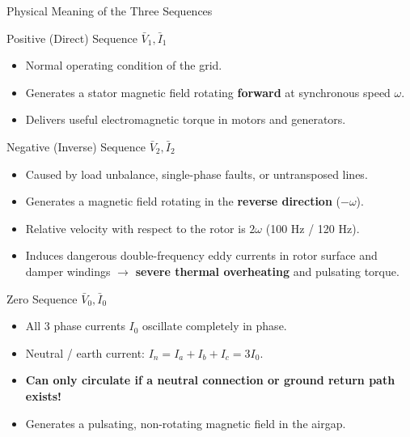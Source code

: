 \begin{frame}[allowframebreaks]{Physical Meaning of the Three Sequences}
    \begin{block}{Positive (Direct) Sequence $\bar{V}_1, \bar{I}_1$}
        \begin{itemize}
            \item Normal operating condition of the grid.
            \item Generates a stator magnetic field rotating \textbf{forward} at synchronous speed $\omega$.
            \item Delivers useful electromagnetic torque in motors and generators.
        \end{itemize}
    \end{block}

    \begin{alertblock}{Negative (Inverse) Sequence $\bar{V}_2, \bar{I}_2$}
        \begin{itemize}
            \item Caused by load unbalance, single-phase faults, or untransposed lines.
            \item Generates a magnetic field rotating in the \textbf{reverse direction} ($-\omega$).
            \item Relative velocity with respect to the rotor is $2\omega$ (100 Hz / 120 Hz).
            \item Induces dangerous double-frequency eddy currents in rotor surface and damper windings $\to$ \alert{\textbf{severe thermal overheating}} and pulsating torque.
        \end{itemize}
    \end{alertblock}

    \begin{block}{Zero Sequence $\bar{V}_0, \bar{I}_0$}
        \begin{itemize}
            \item All 3 phase currents $I_0$ oscillate completely in phase.
            \item Neutral / earth current: $I_n = I_a + I_b + I_c = 3 I_0$.
            \item \textbf{Can only circulate if a neutral connection or ground return path exists!}
            \item Generates a pulsating, non-rotating magnetic field in the airgap.
        \end{itemize}
    \end{block}
\end{frame}

